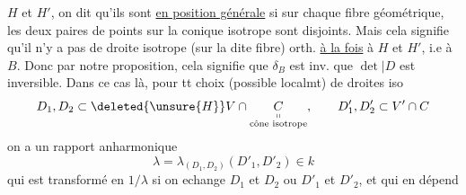 $H$ et $H'$, on dit qu'ils sont \uline{en position générale} si sur chaque fibre géométrique, les deux paires de points sur la conique isotrope sont disjoints. Mais cela signifie  qu'il n'y a pas de droite isotrope (sur la dite fibre) orth. \uline{à la fois} à $H$ et $H'$, i.e à $B$. Donc par notre proposition, cela signifie que $\delta_B$ est inv.  que $\det\big|D$ est inversible.  Dans ce cas là,  pour tt choix (possible localmt)  de droites iso
\[
 D_1,D_2\subset \deleted{\unsure{H}}V\cap\underset{\substack{\shortparallel\\\text{cône isotrope}}}{C},\qquad D'_1,D'_2\subset V'\cap C
\]
on a un rapport anharmonique
\[
 \lambda=\lambda_{(D_1,D_2)}(D'_1,D'_2)\in k
\]
qui est transformé en $1/\lambda$ si on echange $D_1$ et $D_2$ ou $D'_1$ et $D'_2$, et qui en dépend
